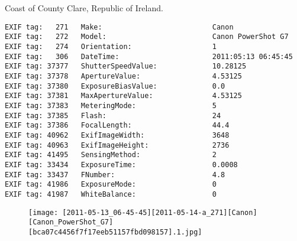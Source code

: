 \section{\protect{}}
\noindent Coast of County Clare, Republic of Ireland.
\noindent
\begin{lstlisting}
EXIF tag:   271   Make:                          Canon
EXIF tag:   272   Model:                         Canon PowerShot G7
EXIF tag:   274   Orientation:                   1
EXIF tag:   306   DateTime:                      2011:05:13 06:45:45
EXIF tag: 37377   ShutterSpeedValue:             10.28125
EXIF tag: 37378   ApertureValue:                 4.53125
EXIF tag: 37380   ExposureBiasValue:             0.0
EXIF tag: 37381   MaxApertureValue:              4.53125
EXIF tag: 37383   MeteringMode:                  5
EXIF tag: 37385   Flash:                         24
EXIF tag: 37386   FocalLength:                   44.4
EXIF tag: 40962   ExifImageWidth:                3648
EXIF tag: 40963   ExifImageHeight:               2736
EXIF tag: 41495   SensingMethod:                 2
EXIF tag: 33434   ExposureTime:                  0.0008
EXIF tag: 33437   FNumber:                       4.8
EXIF tag: 41986   ExposureMode:                  0
EXIF tag: 41987   WhiteBalance:                  0

\end{lstlisting}
\clearpage
\begin{figure}
\raggedleft
\texttt{[image: [2011-05-13\_06-45-45][2011-05-14-a\_271][Canon][Canon\_PowerShot\_G7][bca07c4456f7f17eeb51157fbd098157].1.jpg]}
\end{figure}


\clearpage
